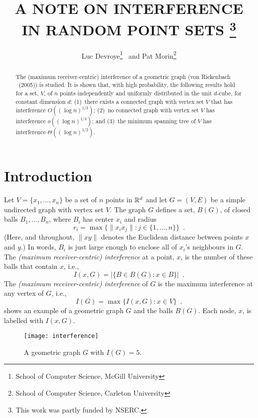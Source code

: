 \documentclass{patmorin}
\title{\MakeTextUppercase{A Note on Interference in Random Point Sets}%
   \thanks{This work was partly funded by NSERC.}}
\author{Luc Devroye\thanks{School of Computer Science, McGill University}
        \ and
        Pat Morin\thanks{School of Computer Science, Carleton University}}
\begin{document}
\maketitle

\begin{abstract}
  The (maximum receiver-centric) interference of a geometric graph
  (von Rickenbach \etal\ (2005)) is studied.  It is shown that,
  with high probability, the following results hold for a set, $V$,
  of $n$ points independently and uniformly distributed in the unit
  $d$-cube, for constant dimension $d$: (1)~there exists a connected
  graph with vertex set $V$ that has interference $O((\log n)^{1/3})$;
  (2)~no connected graph with vertex set $V$ has interference $o((\log
  n)^{1/4})$; and (3)~the minimum spanning tree of $V$ has interference
  $\Theta((\log n)^{1/2})$.
\end{abstract}

\section{Introduction}


Let $V=\{x_1,\ldots,x_n\}$ be a set of $n$ points in $\mathbb{R}^d$ and let
$G=(V,E)$ be a simple undirected graph with vertex set $V$.  The graph
$G$ defines a set, $B(G)$, of closed balls $B_1,\ldots,B_n$, where $B_i$
has center $x_i$ and radius
\[
   r_i = \max\{\|x_ix_j\| : j\in\{1,\ldots,n\}\} \enspace .
\]
(Here, and throughout, $\|xy\|$ denotes the Euclidean distance between
points $x$ and $y$.)  In words, $B_i$ is just large enough to enclose
all of $x_i$'s neighbours in $G$.  The \emph{(maximum receiver-centric)
interference} at a point, $x$, is the number of these balls that contain
$x$, i.e.,
\[
    I(x,G) = |\{B\in B(G) : x\in B\}| \enspace .
\]
The \emph{(maximum receiver-centric) interference} of $G$ is the maximum
interference at any vertex of $G$, i.e.,
\[
   I(G) = \max\{I(x,G) : x\in V\} \enspace .
\]
 shows an example of a geometric graph $G$ and the
balls $B(G)$.  Each node, $x$, is labelled with $I(x,G)$.
\begin{figure}
  \begin{center}
    \texttt{[image: interference]}
  \end{center}
  \caption{A geometric graph $G$ with $I(G)=5$.}
\end{figure}
\end{document}
